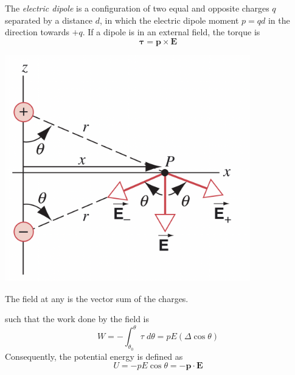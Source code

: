 \documentclass{tufte-book}
\renewcommand{\b}{\mathbf}
\begin{document}
The \emph{electric dipole} is a configuration of two equal and opposite charges $q$ separated by a distance $d$, in which the electric dipole moment $p = qd$ in the direction towards $+q$. If a dipole is in an external field, the torque is
\begin{equation}
  \b \tau = \b p \times \b E
\end{equation}
%
\begin{marginfigure}
  \includegraphics[width=0.8\textwidth]{dipole}
  \caption{The field at any is the vector sum of the charges.}
\end{marginfigure}
%
such that the work done by the field is
\begin{equation}
  W = - \int_{\theta_0}^\theta \tau \; d \theta = pE(\Delta \cos \theta)
\end{equation}
Consequently, the potential energy is defined as
\begin{equation}
  U = -pE \cos \theta = - \b p \cdot \b E
\end{equation}
\end{document}
